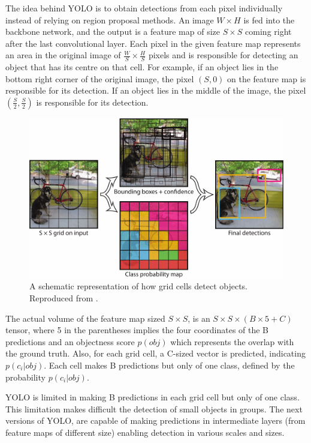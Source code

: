 The idea behind YOLO is to obtain detections from each pixel individually instead of relying on region proposal methods. An image $W\times H$ is fed into the backbone network, and the output is a feature map of size $S\times S$ coming right after the last convolutional layer. Each pixel in the given feature map represents an area in the original image of $\frac{W}{S} \times \frac{H}{S}$ pixels and is responsible for detecting an object that has its centre on that cell. For example, if an object lies in the bottom right corner of the original image, the pixel $(S,0)$ on the feature map is responsible for its detection. If an object lies in the middle of the image, the pixel $(\frac{S}{2},\frac{S}{2})$ is responsible for its detection. 
 
\begin{figure}[!htb]
  \centering
  \includegraphics[width=12cm]{figures/ch2/fig5.png}
  \caption{A schematic representation of how grid cells detect objects. Reproduced from \cite{redmon2016you}.}
  \label{fig5}
\end{figure} 
 
The actual volume of the feature map sized $S\times S$, is an $S\times S \times (B\times5+C)$ tensor, where 5 in the parentheses implies the four coordinates of the B predictions and an objectness score $p(obj)$ which represents the overlap with the ground truth. Also, for each grid cell, a C-sized vector is predicted, indicating $p(c_i|obj)$. Each cell makes B predictions but only of one class, defined by the probability $p(c_i|obj)$. 

YOLO is limited in making B predictions in each grid cell but only of one class. This limitation makes difficult the detection of small objects in groups. The next versions of YOLO, are capable of making predictions in intermediate layers (from feature maps of different size) enabling detection in various scales and sizes. 
 
